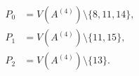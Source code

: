 \begin{equation}\label{eq:secondary-profiles}
\begin{aligned}
 P_0&=V(A^{(4)})\setminus\{8,11,14\},\\
 P_1&=V(A^{(4)})\setminus\{11,15\},\\
 P_2&=V(A^{(4)})\setminus\{13\}.
\end{aligned}
\end{equation}
